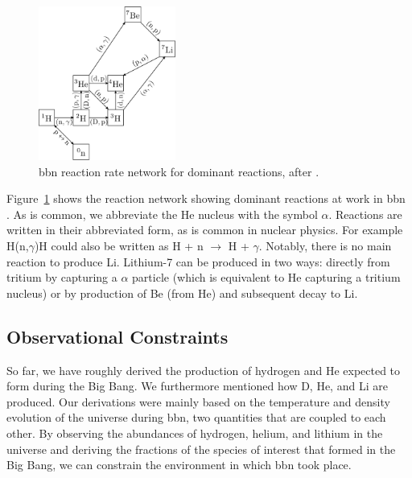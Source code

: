 \begin{figure}[tb]
    \centering
    \includegraphics[width=0.4\textwidth]{graphics/bbn/reaction_network}
    \caption{\ac{bbn} reaction rate network for dominant reactions, after \citet{nollett2000}.}
    \label{fig:bbn:reaction_network}
\end{figure}
Figure~\ref{fig:bbn:reaction_network} shows the reaction network showing dominant reactions at work in \ac{bbn} \citep[after][]{nollett2000}. As is common, we abbreviate the He nucleus with the symbol $\alpha$. Reactions are written in their abbreviated form, as is common in nuclear physics. For example H(n,$\gamma$)H could also be written as H + n $\longrightarrow$ H + $\gamma$. Notably, there is no main reaction to produce Li. Lithium-7 can be produced in two ways: directly from tritium by capturing a $\alpha$ particle (which is equivalent to He capturing a tritium nucleus) or by production of Be (from He) and subsequent decay to Li.


\subsection{Observational Constraints}

So far, we have roughly derived the production of hydrogen and He expected to form during the Big Bang. We furthermore mentioned how D, He, and Li are produced. Our derivations were mainly based on the temperature and density evolution of the universe during \ac{bbn}, two quantities that are coupled to each other. By observing the abundances of hydrogen, helium, and lithium in the universe and deriving the fractions of the species of interest that formed in the Big Bang, we can constrain the environment in which \ac{bbn} took place. 

